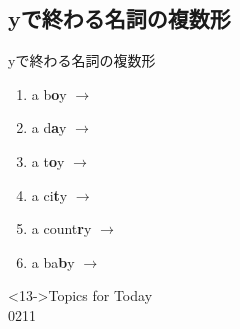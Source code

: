 \documentclass[aspectratio=169,xcolor={dvipsnames,table}]{beamer}
\newcommand{\myaudio}[1]{\href{#1}{\faVolumeUp}}
\begin{document}
\subsection{yで終わる名詞の複数形}
\begin{frame}[plain]{yで終わる名詞の複数形}\Large
\begin{enumerate}
 \item<1-> a b\textbf<14->{\textcolor<14->{YellowOrange}{o}}y $\rightarrow$ 
 \item<3-> a d\textbf<14->{\textcolor<14->{YellowOrange}{a}}y $\rightarrow$ 
 \item<5-> a t\textbf<14->{\textcolor<14->{YellowOrange}{o}}y $\rightarrow$ 
 \item<7-> a ci\textbf<14->{\textcolor<14->{CarnationPink}{t}}y $\rightarrow$ 
 \item<9-> a count\textbf<14->{\textcolor<14->{CarnationPink}{r}}y $\rightarrow$ 
 \item<11-> a ba\textbf<14->{\textcolor<14->{CarnationPink}{b}}y $\rightarrow$ 
\end{enumerate} 

\normalsize
\begin{block}<13->{Topics for Today}
\\
{\tiny 0211}\,{\scriptsize \myaudio{./audio/005_singular_plural_b.mp3}}\hfill{}
\end{block}

\end{frame}
\end{document}
